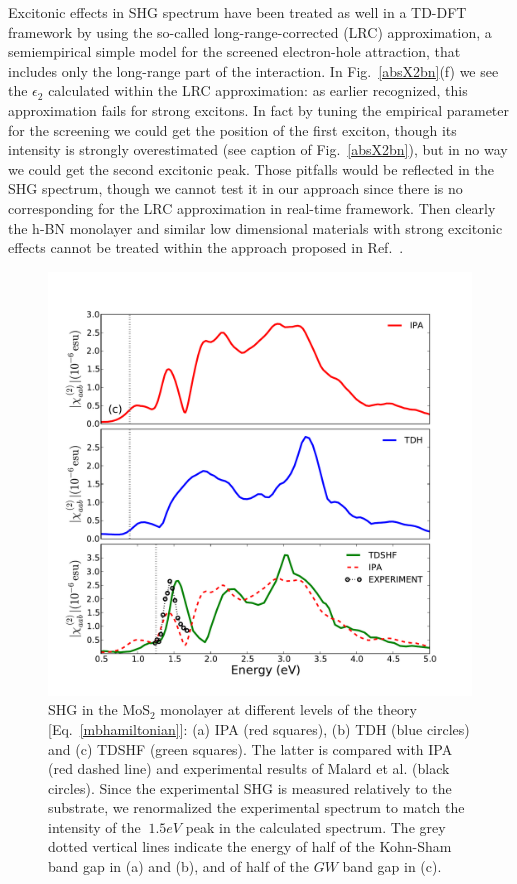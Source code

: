 Excitonic effects in SHG spectrum have been treated as well in a TD-DFT framework\cite{PhysRevB.82.235201} by using the so-called long-range-corrected (LRC) approximation,\cite{LRC} a semiempirical simple model for the screened electron-hole attraction, that includes only the long-range part of the interaction. In Fig.~\ref{absX2bn}(f) we see the $\epsilon_2$ calculated within the LRC approximation: as earlier recognized, this approximation fails for strong excitons. In fact by tuning the empirical parameter for the screening we could get the position of the first exciton, though its intensity is strongly overestimated (see caption of Fig.~\ref{absX2bn}), but in no way we could get the second excitonic peak. Those pitfalls would be reflected in the SHG spectrum, though we cannot test it in our approach since there is no corresponding for the LRC approximation in real-time framework. Then clearly the h-BN monolayer and similar low dimensional materials with strong excitonic effects cannot be treated within the approach proposed in Ref.~\cite{PhysRevB.82.235201}.

\begin{figure}[h]
\centering
\includegraphics[width=.5\textwidth]{Figures/absX2MoS2}
\caption{\footnotesize{SHG in the MoS$_2$ monolayer at different levels of the theory [Eq.~\eqref{mbhamiltonian}]: (a) IPA (red squares), (b) TDH (blue circles) and (c) TDSHF (green squares). The latter is compared with IPA (red dashed line) and experimental results of Malard et al.\cite{PhysRevB.87.201401} (black circles). Since the experimental SHG is measured relatively to the substrate, we renormalized the experimental spectrum to match the intensity of the $~ 1.5 eV$ peak in the calculated spectrum. The grey dotted vertical lines indicate the energy of half of the Kohn-Sham band gap in (a) and (b), and of  half of the $GW$ band gap in (c).}\label{fg:SHMoS2}}
\end{figure}    

